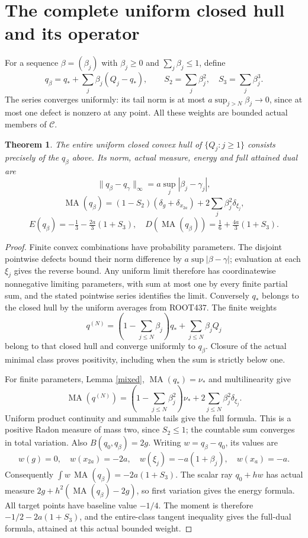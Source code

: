 \documentclass[11pt]{article}
\newtheorem{theorem}{Theorem}
\newcommand{\MA}{\operatorname{MA}}
\newcommand{\C}{\mathcal C}
\begin{document}
\section{The complete uniform closed hull and its operator}
For a sequence $\beta=(\beta_j)$ with $\beta_j\ge0$ and
$\sum_j\beta_j\le1$, define
\[
 q_\beta=q_*+\sum_j\beta_j(Q_j-q_*),\qquad
 S_2=\sum_j\beta_j^2,\quad S_3=\sum_j\beta_j^3.
\]
The series converges uniformly: its tail norm is at most
$a\sup_{j>N}\beta_j\to0$, since at most one defect is nonzero at any
point. All these weights are bounded actual members of $\C$.

\begin{theorem}\label{hull}
The entire uniform closed convex hull of $\{Q_j:j\ge1\}$ consists
precisely of the $q_\beta$ above. Its norm, actual measure, energy and
full attained dual are
\[
 \|q_\beta-q_\gamma\|_\infty=a\sup_j|\beta_j-\gamma_j|,
\]
\[
 \MA(q_\beta)=(1-S_2)(\delta_g+\delta_{x_{2a}})
                    +2\sum_j\beta_j^2\delta_{\xi_j},
\]
\[
 E(q_\beta)=-\tfrac13-\tfrac{2a}3(1+S_3),\quad
 D(\MA(q_\beta))=\tfrac16+\tfrac{4a}3(1+S_3).
\]
\end{theorem}
\begin{proof}
Finite convex combinations have probability parameters. The disjoint
pointwise defects bound their norm difference by $a\sup|\beta-\gamma|$;
evaluation at each $\xi_j$ gives the reverse bound. Any uniform limit
therefore has coordinatewise nonnegative limiting parameters, with sum
at most one by every finite partial sum, and the stated pointwise series
identifies the limit. Conversely $q_*$ belongs to the closed hull by the
uniform averages from ROOT437. The finite weights
\[
 q^{(N)}=(1-\sum_{j\le N}\beta_j)q_*+\sum_{j\le N}\beta_jQ_j
\]
belong to that closed hull and converge uniformly to $q_\beta$. Closure
of the actual minimal class proves positivity, including when the sum
is strictly below one.

For finite parameters, Lemma \ref{mixed}, $\MA(q_*)=\nu_*$ and
multilinearity give
\[
 \MA(q^{(N)})=(1-\sum_{j\le N}\beta_j^2)\nu_*
                  +2\sum_{j\le N}\beta_j^2\delta_{\xi_j}.
\]
Uniform product continuity and summable tails give the full formula.
This is a positive Radon measure of mass two, since $S_2\le1$;
the countable sum converges in total variation. Also $B(q_0,q_\beta)=2g$.
Writing $w=q_\beta-q_0$, its values are
\[
 w(g)=0,\quad w(x_{2a})=-2a,\quad
 w(\xi_j)=-a(1+\beta_j),\quad w(x_a)=-a.
\]
Consequently $\int w\,\MA(q_\beta)=-2a(1+S_3)$.
The scalar ray $q_0+h w$ has actual measure
$2g+h^2(\MA(q_\beta)-2g)$, so first variation gives the energy formula.
All target points have baseline value $-1/4$. The moment is therefore
$-1/2-2a(1+S_3)$, and the entire-class tangent inequality gives the
full-dual formula, attained at this actual bounded weight.
\end{proof}
\end{document}
